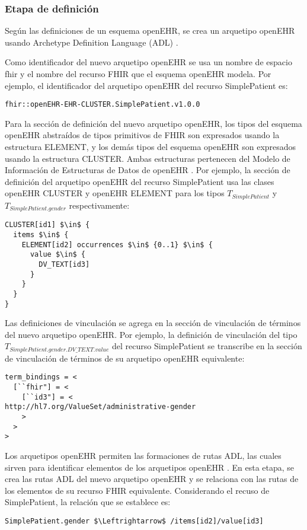 \subsubsection{Etapa de definición}

Según las definiciones de un esquema openEHR, se crea un arquetipo openEHR usando Archetype Definition Language (ADL) \cite{openEHRADL}.

Como identificador del nuevo arquetipo openEHR se usa un nombre de espacio fhir y el nombre del recurso FHIR que el esquema openEHR modela. Por ejemplo, el identificador del arquetipo openEHR del recurso SimplePatient es:

\begin{lstlisting}
fhir::openEHR-EHR-CLUSTER.SimplePatient.v1.0.0
\end{lstlisting}

Para la sección de definición del nuevo arquetipo openEHR, los tipos del esquema openEHR abstraídos de tipos primitivos de FHIR son expresados usando la estructura ELEMENT, y los demás tipos del esquema openEHR son expresados usando la estructura CLUSTER. Ambas estructuras pertenecen del Modelo de Información de Estructuras de Datos de openEHR \cite{openEHRDataStructures}. Por ejemplo, la sección de definición del arquetipo openEHR del recurso SimplePatient usa las clases openEHR CLUSTER y openEHR ELEMENT para los tipos \(T_{SimplePatient}\) y \(T_{SimplePatient.gender}\) respectivamente:

\begin{lstlisting}[mathescape=true]
CLUSTER[id1] $\in$ {
  items $\in$ {
    ELEMENT[id2] occurrences $\in$ {0..1} $\in$ {
      value $\in$ {
        DV_TEXT[id3]
      }
    }
  }
}
\end{lstlisting}

Las definiciones de vinculación se agrega en la sección de vinculación de términos del nuevo arquetipo openEHR. Por ejemplo, la definición de vinculación del tipo \(T_{SimplePatient.gender.DV\_TEXT.value}\) del recurso SimplePatient se transcribe en la sección de vinculación de términos de su arquetipo openEHR equivalente:

\begin{lstlisting}
term_bindings = <
  [``fhir"] = <
    [``id3"] = <
http://hl7.org/ValueSet/administrative-gender
    >
  >
>
\end{lstlisting}

Los arquetipos openEHR permiten las formaciones de rutas ADL, las cuales sirven para identificar elementos de los arquetipos openEHR \cite{openEHRArchitecture}. En esta etapa, se crea las rutas ADL del nuevo arquetipo openEHR y se relaciona con las rutas de los elementos de su recurso FHIR equivalente. Considerando el recuso de SimplePatient, la relación que se establece es:

\begin{lstlisting}[mathescape=true]
SimplePatient.gender $\Leftrightarrow$ /items[id2]/value[id3]
\end{lstlisting}
